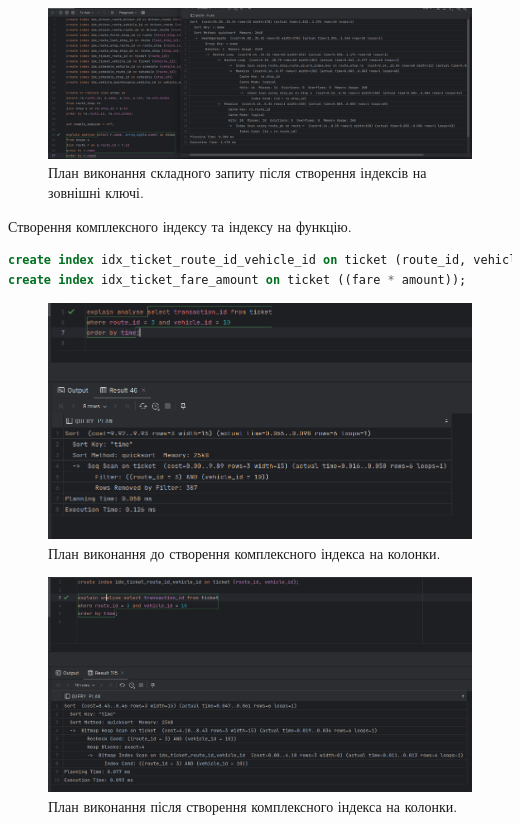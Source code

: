 \documentclass[14pt]{extreport}
\begin{document}
\begin{normalsize}
	\begin{figure}[H]
		\centering
		\includegraphics[scale=0.35]{6}
		\caption{План виконання складного запиту після створення індексів на зовнішні ключі.}
	\end{figure}
	
	Створення комплексного індексу та індексу на функцію.
	\begin{small}
		\begin{lstlisting}[language=sql]
create index idx_ticket_route_id_vehicle_id on ticket (route_id, vehicle_id)
create index idx_ticket_fare_amount on ticket ((fare * amount));
		\end{lstlisting}
	\end{small}
	
	\begin{figure}[H]
		\centering
		\includegraphics[scale=0.7]{1}
		\caption{План виконання до створення комплексного індекса на колонки.}
	\end{figure}
	
	\begin{figure}[H]
		\centering
		\includegraphics[scale=0.5]{2}
		\caption{План виконання після створення комплексного індекса на колонки.}
	\end{figure}
	

\end{normalsize}
\end{document}
